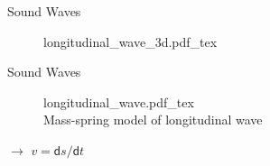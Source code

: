 \begin{frame}{Sound Waves \cont}

    \begin{figure}
        \def\svgwidth{.6\columnwidth}
        {longitudinal_wave_3d.pdf_tex}
    \end{figure}

\end{frame}


\begin{frame}{Sound Waves \cont}

    \vspace{.4cm}
    \begin{figure}
        \def\svgwidth{.5\columnwidth}
        {longitudinal_wave.pdf_tex}\\
        { Mass-spring model of longitudinal wave}
    \end{figure}

    $\rightarrow$  $v = {\mathsf{d} s}/{\mathsf{d} t}$

\end{frame}


%
%
%
%


